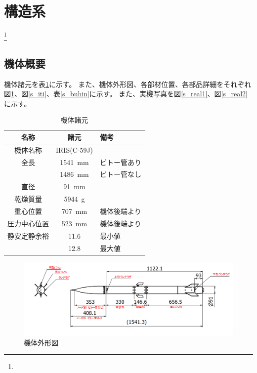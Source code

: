 \documentclass[a4paper,11pt,titlepage,uplatex]{jsarticle}
\begin{document}
\newpage
\section{構造系}

\footnote{}

\subsection{機体概要}
機体諸元を表\ref{s_59syogen}に示す。
また、機体外形図、各部材位置、各部品詳細をそれぞれ図\ref{s_gaikei}、図\ref{s_iti}、表\ref{s_buhin}に示す。
また、実機写真を図\ref{s_real1}、図\ref{s_real2}に示す。

\begin{table}[H]
    \centering
    \caption{機体諸元}
    \begin{tabular}{ccl} \toprule
        名称 & 諸元 & 備考\\\midrule
        機体名称 & IRIS(C-59J)\\
        全長 & \SI{1541}{mm} & ピトー管あり\\
         & \SI{1486}{mm} & ピトー管なし\\
        直径 & \SI{91}{mm}\\
        乾燥質量 & \SI{5944}{g}\\
        重心位置 & \SI{707}{mm} & 機体後端より\\
        圧力中心位置 & \SI{523}{mm} & 機体後端より\\
        静安定静余裕 & 11.6 & 最小値\\
         & 12.8 & 最大値\\
        \bottomrule
    \end{tabular}
    \label{s_59syogen}
\end{table}

\begin{figure}[H]
    \centering
    \includegraphics[scale = 0.6]{pic_str/s_sunpou.png}
    \caption{機体外形図}
    \label{s_gaikei}
\end{figure}
\end{document}
